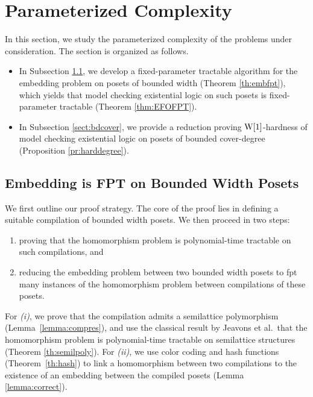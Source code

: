 \documentclass[usletter]{article}
\newcommand{\longversion}[1]{#1}
\begin{document}
\longversion{\pfnocw}

\section{Parameterized Complexity}\label{sect:mainresults}
In this section, we study the parameterized complexity of the problems under consideration. 
The section is organized as follows.
\begin{itemize}
\item In Subsection \ref{sect:embfpt}, we develop a fixed-parameter tractable algorithm for the embedding problem on posets of bounded width (Theorem \ref{th:embfpt}), 
which yields that model checking existential logic on such posets is fixed-parameter tractable (Theorem \ref{thm:EFOFPT}).
\item In Subsection \ref{sect:bdcover}, we provide a reduction proving $\textup{W[1]}$-hardness of model checking 
existential logic on posets of bounded cover-degree (Proposition \ref{pr:harddegree}).
\end{itemize}

\subsection{Embedding is FPT on Bounded Width Posets}\label{sect:embfpt}

We first outline our proof strategy.  
The core of the proof lies in defining a suitable 
compilation of bounded width posets. We then proceed in two steps: 
\begin{enumerate}[label=\textit{(\roman*)}] 
\item proving that the homomorphism problem is polynomial-time tractable on such compilations, and
\item reducing the embedding problem between two bounded width posets to fpt many instances 
of the homomorphism problem between compilations of these posets.
\end{enumerate}
For \textit{(i)}, we prove that the compilation admits a semilattice polymorphism (Lemma~\ref{lemma:compres}), 
and use the classical result by Jeavons et al.\ that the homomorphism problem is polynomial-time tractable on semilattice structures (Theorem \ref{th:semilpoly}).  
For \textit{(ii)}, we use color coding and hash functions (Theorem~\ref{th:hash}) to link a homomorphism between two compilations to the existence 
of an embedding between the compiled posets (Lemma \ref{lemma:correct}).
\end{document}
